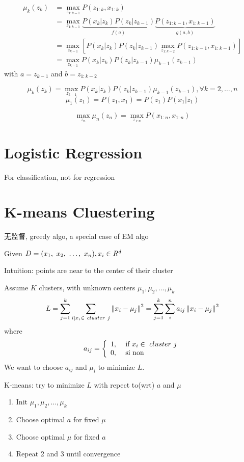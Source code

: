 \documentclass{article}
\begin{document}
$$
\begin{aligned}
\mu_k(z_k)
& = \max_{z_{1:k-1}} P(z_{1:k}, x_{1:k}) \\ 
& = \max_{z_{1:k-1}} \underbrace{P(x_k|z_k) P(z_k|z_{k-1})}_{f(a)} \underbrace{P(z_{1:k-1}, x_{1:k-1})}_{g(a,b)} \\ 
& = \max_{z_{k-1}} [P(x_k|z_k) P(z_k|z_{k-1}) \max_{z_{1:k-2}} P(z_{1:k-1}, x_{1:k-1})] \\ 
& = \max_{z_{k-1}} P(x_k|z_k) P(z_k|z_{k-1}) \mu_{k-1}(z_{k-1})
\end{aligned}
$$
with $a = z_{k-1}$ and $b = z_{1:k-2}$

$$ \mu_k(z_k) = \max_{z_{k-1}} P(x_k|z_k) P(z_k|z_{k-1}) \mu_{k-1}(z_{k-1}), \forall k = 2,\ldots,n $$
$$ \mu_1(z_1) = P(z_1, x_1) = P(z_1) P(x_1|z_1)$$

$$
\max_{z_n} \mu_n(z_n)
= \max_{z_{1:n}} P(x_{1:n}, x_{1:n})
$$

\section{Logistic Regression}
For classification, not for regression

\section{K-means Cluestering}
无监督, greedy algo, a special case of EM algo

Given $D = (x_1,~x_2,~\ldots,~x_n), x_i \in R^d$

Intuition: points are near to the center of their cluster

Assume $K$ clusters, with unknown centers $\mu_1, \mu_2, \ldots, \mu_k$
$$
L
= \sum_{j = 1}^k \sum_{i | x_i \in\ cluster\ j}\left\Vert x_i - \mu_j\right\Vert^2
= \sum_{j = 1}^k \sum_i^n a_{ij}\left\Vert x_i - \mu_j\right\Vert^2
$$
where
$$
a_{ij} =
\left\{
  \begin{array}{ll}
    1, & \textrm{\ if } x_i \in\ cluster\ j\\
    0, & \textrm{ si non}
  \end{array}
\right.
$$
We want to choose $a_{ij}$ and $\mu_i$ to minimize $L$.

K-means: try to minimize $L$ with repect to(wrt) $a$ and $\mu$
\begin{enumerate}
\item Init $\mu_1, \mu_2, \ldots, \mu_k$
\item Choose optimal $a$ for fixed $\mu$
\item Choose optimal $\mu$ for fixed $a$
\item Repeat 2 and 3 until convergence
\end{enumerate}
\end{document}
